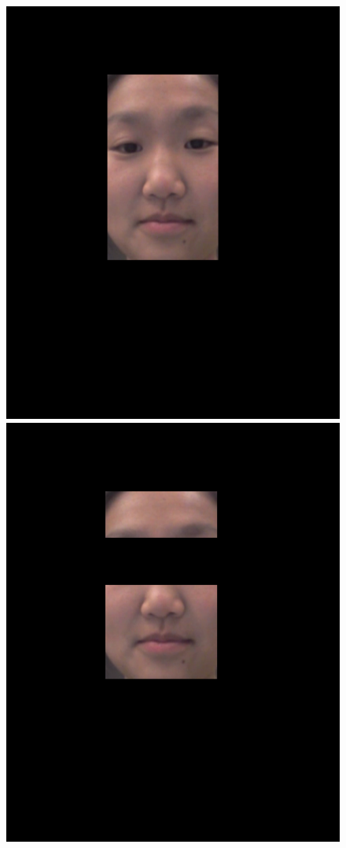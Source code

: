 \documentclass[10pt,twocolumn,letterpaper]{article}
\begin{document}
\begin{figure}
\begin{center}
	\includegraphics[scale=0.2]{figures/jane_box}
	\includegraphics[scale=0.2]{figures/jane_no_eyes}

\end{center}
\end{figure}
\end{document}

